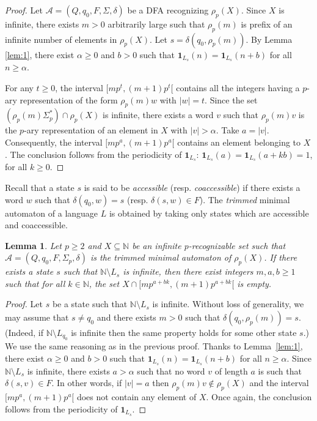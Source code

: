 \documentclass{beatcs}
\newtheorem{lemma}[proposition]{Lemma}
\begin{document}
\begin{proof}
    Let $\mathcal{A}=(Q,q_0,F,\Sigma,\delta)$ be a DFA recognizing
    $\rho_p(X)$. Since $X$ is infinite, there exists $m>0$ arbitrarily
    large such that $\rho_p(m)$ is prefix of an infinite number of
    elements in $\rho_p(X)$. Let $s=\delta(q_0,\rho_p(m))$. By Lemma
    \ref{lem:1}, there exist $\alpha\ge 0$ and $b>0$ such that
    $\mathbf{1}_{L_s}(n)=\mathbf{1}_{L_s}(n+b)$ for all $n\ge \alpha$.
  
  For any $t\ge 0$, the interval $[mp^{t},(m+1)p^t[$ contains all the
  integers having a $p$-ary representation of the form $\rho_p(m)w$
  with $|w|=t$. Since the set $(\rho_p(m)\Sigma_p^*)\cap \rho_p(X)$ is
  infinite, there exists a word $v$ such that $\rho_p(m)v$ is the
  $p$-ary representation of an element in $X$ with $|v|> \alpha$.
  Take $a=|v|$.  Consequently, the interval $[mp^a,(m+1)p^a[$ contains
  an element belonging to $X$. The conclusion follows from the
  periodicity of $\mathbf{1}_{L_s}$:
  $\mathbf{1}_{L_s}(a)=\mathbf{1}_{L_s}(a+kb)=1$, for all $k\ge 0$.
\end{proof}

Recall that a state $s$ is said to be {\it accessible} (resp. {\it
  coaccessible}) if there exists a word $w$ such that
$\delta(q_0,w)=s$ (resp. $\delta(s,w)\in F$). The {\it trimmed}
minimal automaton of a language $L$ is obtained by taking only states
which are accessible and coaccessible.

\begin{lemma}\label{lem:4}
  Let $p\ge 2$ and $X\subseteq\mathbb{N}$ be an infinite
  $p$-recognizable set such that
  $\mathcal{A}=(Q,q_0,F,\Sigma_p,\delta)$ is the trimmed minimal
  automaton of $\rho_p(X)$. If there exists a state $s$ such that
  $\mathbb{N}\setminus L_s$ is infinite, then there exist integers
  $m,a,b\ge 1$ such that for all $k\in\mathbb{N}$, the set
  $X\cap[mp^{a+bk},(m+1)p^{a+bk}[$ is empty.
\end{lemma}

\begin{proof}
  Let $s$ be a state such that $\mathbb{N}\setminus L_s$ is infinite.
  Without loss of generality, we may assume that $s\neq q_0$ and there
  exists $m>0$ such that $\delta(q_0,\rho_p(m))=s$. (Indeed, if
  $\mathbb{N}\setminus L_{q_0}$ is infinite then the same property
  holds for some other state $s$.) We use the same reasoning as in the
  previous proof. Thanks to Lemma~\ref{lem:1}, there exist $\alpha\ge
  0$ and $b>0$ such that $\mathbf{1}_{L_s}(n)=\mathbf{1}_{L_s}(n+b)$
  for all $n\ge \alpha$.  Since $\mathbb{N}\setminus L_s$ is infinite,
  there exists $a> \alpha$ such that no word $v$ of length $a$ is
  such that $\delta(s,v)\in F$. In other words, if $|v|=a$ then
  $\rho_p(m)v\not\in\rho_p(X)$ and the interval $[mp^a,(m+1)p^a[$ does
  not contain any element of $X$. Once again, the conclusion follows
  from the periodicity of $\mathbf{1}_{L_s}$.
\end{proof}
\end{document}

